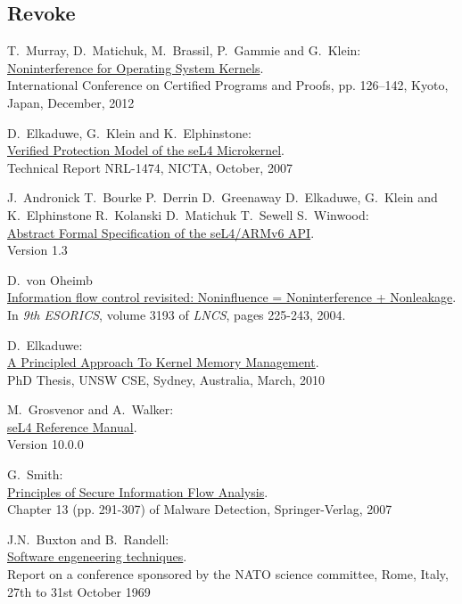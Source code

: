 \documentclass[pdftex,11pt,a4paper,twoside]{article}
\begin{document}
\subsection{Revoke}\label{sec:Revoke}
	\cleardoublepage
	\begin{thebibliography}{99}

	T.\ Murray, D.\ Matichuk, M.\ Brassil, P.\ Gammie and G.\ Klein:	\\ 
	\href{http://www.ssrg.nicta.com/publications/nicta_full_text/6004.pdf}{%
		Noninterference for Operating System Kernels}. \\
    International Conference on Certified Programs and Proofs, pp. 126–142, Kyoto, Japan, December, 2012

	D.\ Elkaduwe, G.\ Klein and K.\ Elphinstone:	\\ 
	\href{http://ts.data61.csiro.au/publications/nicta_full_text/1474.pdf}{%
		Verified Protection Model of the seL4 Microkernel}. \\
   	Technical Report NRL-1474, NICTA, October, 2007
   	
	J.\ Andronick T.\ Bourke P.\ Derrin D.\ Greenaway D.\ Elkaduwe, G.\ Klein and K.\ Elphinstone R.\ Kolanski D.\ Matichuk T.\ Sewell S.\ Winwood:	\\ 
	\href{https://sel4.systems/Info/Docs/seL4-spec.pdf}{%
		Abstract Formal Specification of the seL4/ARMv6 API}. \\
   	Version 1.3
   	
	D.\ von Oheimb	\\ 
	\href{https://pdfs.semanticscholar.org/21ea/6c722535ed0a22175187796b43c114e14ee8.pdf}{%
		Information flow control revisited: Noninfluence = Noninterference + Nonleakage}. \\
   	In \textit{9th ESORICS}, volume 3193 of \textit{LNCS}, pages 225-243, 2004.
   	
	D.\ Elkaduwe:	\\ 
	\href{https://ts.data61.csiro.au/publications/papers/Elkaduwe:phd.pdf}{%
		A Principled Approach To Kernel Memory Management}. \\
   	PhD Thesis, UNSW CSE, Sydney, Australia, March, 2010

	M.\ Grosvenor and A.\ Walker:	\\ 
	\href{http://sel4.systems/Info/Docs/seL4-manual-latest.pdf}{%
		seL4 Reference Manual}. \\
   	Version 10.0.0
   	
	G.\ Smith:\\ 
	\href{http://users.cis.fiu.edu/~smithg/papers/sif06.pdf}{%
		Principles of Secure Information Flow Analysis}. \\
   	Chapter 13 (pp. 291-307) of Malware Detection,  Springer-Verlag, 2007
   	
   	J.N.\ Buxton and B.\ Randell:\\
   	\href{http://homepages.cs.ncl.ac.uk/brian.randell/NATO/nato1969.PDF}{%
   		Software engeneering techniques}. \\
   		Report on a conference sponsored by the NATO science committee, Rome, Italy, 27th to 31st October 1969
\end{thebibliography}
	
\end{document}
